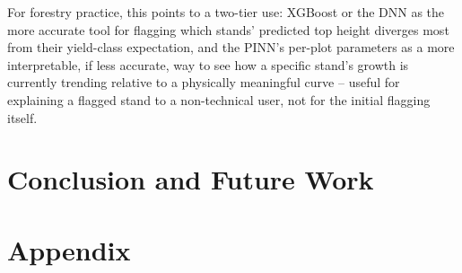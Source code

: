 \documentclass[logo,msc,ai]{infthesis}           %
\begin{document}
For forestry practice, this points to a two-tier use: XGBoost or the DNN as the more accurate tool for flagging which stands' predicted top height diverges most from their yield-class expectation, and the PINN's per-plot parameters as a more interpretable, if less accurate, way to see how a specific stand's growth is currently trending relative to a physically meaningful curve -- useful for explaining a flagged stand to a non-technical user, not for the initial flagging itself.





\chapter{Conclusion and Future Work} \label{ch:conc}




\appendix
\chapter{Appendix}  \label{chap:appendix}



\end{document}
